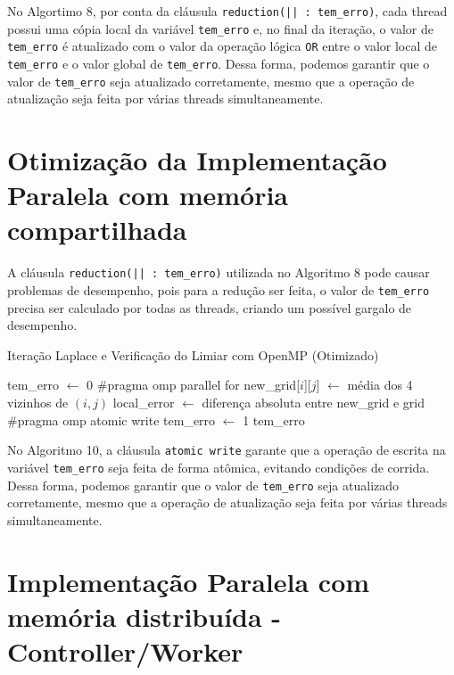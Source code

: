 \documentclass[conference]{IEEEtran}
\begin{document}
No Algortimo 8, por conta da cláusula \texttt{reduction(|| : tem\_erro)}, cada thread possui uma cópia local da variável \texttt{tem\_erro} e, no final da iteração, o valor de \texttt{tem\_erro} é atualizado com o valor da operação lógica \texttt{OR} entre o valor local de \texttt{tem\_erro} e o valor global de \texttt{tem\_erro}. Dessa forma, podemos garantir que o valor de \texttt{tem\_erro} seja atualizado corretamente, mesmo que a operação de atualização seja feita por várias threads simultaneamente.

\section{Otimização da Implementação Paralela com memória compartilhada}

A cláusula \texttt{reduction(|| : tem\_erro)} utilizada no Algoritmo 8 pode causar problemas de desempenho, pois para a redução ser feita, o valor de \texttt{tem\_erro} precisa ser calculado por todas as threads, criando um possível gargalo de desempenho.

\begin{algorithm}[H]
    \caption{Iteração Laplace e Verificação do Limiar com OpenMP (Otimizado)}
    \begin{algorithmic}[1]
        \State tem\_erro $\gets$ 0
        \State \#pragma omp parallel for
        \State new\_grid[$i$][$j$] $\gets$ média dos 4 vizinhos de $(i, j)$
        \State local\_error $\gets$ diferença absoluta entre new\_grid e grid
        \State \#pragma omp atomic write
        \State tem\_erro $\gets$ 1
        \EndIf
        \EndFor
        \State \Return tem\_erro
        \EndFunction
    \end{algorithmic}
\end{algorithm}

No Algoritmo 10, a cláusula \texttt{atomic write} garante que a operação de escrita na variável \texttt{tem\_erro} seja feita de forma atômica, evitando condições de corrida. Dessa forma, podemos garantir que o valor de \texttt{tem\_erro} seja atualizado corretamente, mesmo que a operação de atualização seja feita por várias threads simultaneamente.

\section{Implementação Paralela com memória distribuída - Controller/Worker}
\end{document}
